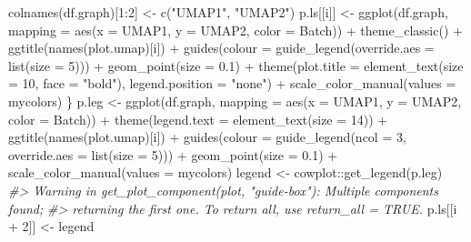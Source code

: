 \documentclass[]{article}
\newcommand{\hlnum}[1]{\textcolor[rgb]{0.816,0.125,0.439}{#1}}%
\newcommand{\hlstr}[1]{\textcolor[rgb]{0.251,0.627,0.251}{#1}}%
\newcommand{\hlcom}[1]{\textcolor[rgb]{0.502,0.502,0.502}{\textit{#1}}}%
\newcommand{\hlstd}[1]{\textcolor[rgb]{0.251,0.251,0.251}{#1}}%
\newenvironment{Shaded}{\begin{myshaded}}{\end{myshaded}}
\newcommand{\DecValTok}[1]{\hlnum{#1}}
\newcommand{\FloatTok}[1]{\hlnum{#1}}
\newcommand{\SpecialCharTok}[1]{\hlstr{#1}}
\newcommand{\StringTok}[1]{\hlstr{#1}}
\newcommand{\CommentTok}[1]{\hlcom{#1}}
\newcommand{\OtherTok}[1]{{#1}}
\newcommand{\FunctionTok}[1]{\hlstd{#1}}
\newcommand{\AttributeTok}[1]{{#1}}
\newcommand{\NormalTok}[1]{\hlstd{#1}}
\begin{document}
\begin{Shaded}
\begin{Highlighting}[]
    \FunctionTok{colnames}\NormalTok{(df.graph)[}\DecValTok{1}\SpecialCharTok{:}\DecValTok{2}\NormalTok{] }\OtherTok{\textless{}{-}} \FunctionTok{c}\NormalTok{(}\StringTok{"UMAP1"}\NormalTok{, }\StringTok{"UMAP2"}\NormalTok{)}
\NormalTok{    p.ls[[i]] }\OtherTok{\textless{}{-}} \FunctionTok{ggplot}\NormalTok{(df.graph, }\AttributeTok{mapping =} \FunctionTok{aes}\NormalTok{(}\AttributeTok{x =}\NormalTok{ UMAP1, }\AttributeTok{y =}\NormalTok{ UMAP2,}
        \AttributeTok{color =}\NormalTok{ Batch)) }\SpecialCharTok{+} \FunctionTok{theme\_classic}\NormalTok{() }\SpecialCharTok{+} \FunctionTok{ggtitle}\NormalTok{(}\FunctionTok{names}\NormalTok{(plot.umap)[i]) }\SpecialCharTok{+}
        \FunctionTok{guides}\NormalTok{(}\AttributeTok{colour =} \FunctionTok{guide\_legend}\NormalTok{(}\AttributeTok{override.aes =} \FunctionTok{list}\NormalTok{(}\AttributeTok{size =} \DecValTok{5}\NormalTok{))) }\SpecialCharTok{+}
        \FunctionTok{geom\_point}\NormalTok{(}\AttributeTok{size =} \FloatTok{0.1}\NormalTok{) }\SpecialCharTok{+} \FunctionTok{theme}\NormalTok{(}\AttributeTok{plot.title =} \FunctionTok{element\_text}\NormalTok{(}\AttributeTok{size =} \DecValTok{10}\NormalTok{,}
        \AttributeTok{face =} \StringTok{"bold"}\NormalTok{), }\AttributeTok{legend.position =} \StringTok{"none"}\NormalTok{) }\SpecialCharTok{+} \FunctionTok{scale\_color\_manual}\NormalTok{(}\AttributeTok{values =}\NormalTok{ mycolors)}
\NormalTok{\}}
\NormalTok{p.leg }\OtherTok{\textless{}{-}} \FunctionTok{ggplot}\NormalTok{(df.graph, }\AttributeTok{mapping =} \FunctionTok{aes}\NormalTok{(}\AttributeTok{x =}\NormalTok{ UMAP1, }\AttributeTok{y =}\NormalTok{ UMAP2,}
    \AttributeTok{color =}\NormalTok{ Batch)) }\SpecialCharTok{+} \FunctionTok{theme}\NormalTok{(}\AttributeTok{legend.text =} \FunctionTok{element\_text}\NormalTok{(}\AttributeTok{size =} \DecValTok{14}\NormalTok{)) }\SpecialCharTok{+}
    \FunctionTok{ggtitle}\NormalTok{(}\FunctionTok{names}\NormalTok{(plot.umap)[i]) }\SpecialCharTok{+} \FunctionTok{guides}\NormalTok{(}\AttributeTok{colour =} \FunctionTok{guide\_legend}\NormalTok{(}\AttributeTok{ncol =} \DecValTok{3}\NormalTok{,}
    \AttributeTok{override.aes =} \FunctionTok{list}\NormalTok{(}\AttributeTok{size =} \DecValTok{5}\NormalTok{))) }\SpecialCharTok{+} \FunctionTok{geom\_point}\NormalTok{(}\AttributeTok{size =} \FloatTok{0.1}\NormalTok{) }\SpecialCharTok{+}
    \FunctionTok{scale\_color\_manual}\NormalTok{(}\AttributeTok{values =}\NormalTok{ mycolors)}
\NormalTok{legend }\OtherTok{\textless{}{-}}\NormalTok{ cowplot}\SpecialCharTok{::}\FunctionTok{get\_legend}\NormalTok{(p.leg)}
\CommentTok{\#\textgreater{} Warning in get\_plot\_component(plot, "guide{-}box"): Multiple components found;}
\CommentTok{\#\textgreater{} returning the first one. To return all, use \textasciigrave{}return\_all = TRUE\textasciigrave{}.}
\NormalTok{p.ls[[i }\SpecialCharTok{+} \DecValTok{2}\NormalTok{]] }\OtherTok{\textless{}{-}}\NormalTok{ legend}


\end{Highlighting}
\end{Shaded}
\end{document}
